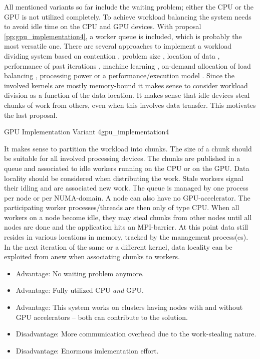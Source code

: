 \documentclass{article}
\theoremstyle{plain} %
\theoremstyle{convention} %
\theoremstyle{remark} %
\numberwithin{equation}{section}
\begin{document}
All mentioned variants so far include the waiting problem; either the CPU or the GPU is not utilized completely. To achieve workload balancing the system needs to avoid idle time on the CPU and GPU devices. With proposal \ref{pp:gpu_implementation4}, a worker queue is included, which is probably the most versatile one. There are several approaches to implement a workload dividing system based on contention \cite{gregg2010}, problem size \cite{ding2009}, location of data \cite{becchi2010,augonnet2011}, performance of past iterations \cite{li2011,choi2013,bernabe2013,belviranli2013}, machine learning \cite{grewe2011}, on-demand allocation of load balancing \cite{agulleiro2012,teodoro2012}, processing power \cite{lu2012,hawick2013} or a performance/execution model \cite{augonnet2011,ogata2008}. Since the involved kernels are mostly memory-bound it makes sense to consider workload division as a function of the data location. It makes sense that idle devices steal chunks of work from others, even when this involves data transfer. This motivates the last proposal.

\begin{proposal}{GPU Implementation Variant 4}{gpu_implementation4} %

It makes sense to partition the workload into chunks. The size of a chunk should be suitable for all involved processing devices. The chunks are published in a queue and associated to idle workers running on the CPU or on the GPU. Data locality should be considered when distributing the work. Stale workers signal their idling and are associated new work. The queue is managed by one process per node or per NUMA-domain. A node can also have no GPU-accelerator. The participating worker processes/threads are then only of type CPU. When all workers on a node become idle, they may steal chunks from other nodes until all nodes are done and the application hits an MPI-barrier. At this point data still resides in various locations in memory, tracked by the management process(es). In the next iteration of the same or a different kernel, data locality can be exploited from anew when associating chunks to workers.

\begin{itemize}
    \item Advantage: No waiting problem anymore.
    \item Advantage: Fully utilized CPU \textit{and} GPU.
    \item Advantage: This system works on clusters having nodes with and without GPU accelerators -- both can contribute to the solution.
    \item Disadvantage: More communication overhead due to the work-stealing nature.
    \item Disadvantage: Enormous imlementation effort.
\end{itemize}


\end{proposal}
\end{document}
